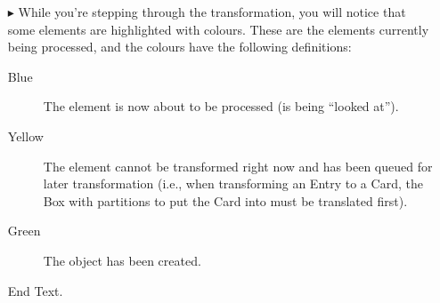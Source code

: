 \begin{itemize}
\newpage

\item[$\blacktriangleright$] While you're stepping through the transformation, you will notice that some elements are highlighted with colours. These are the
elements currently being processed, and the colours have the following definitions:

\begin{description}
  \item[Blue] The element is now about to be processed (is being ``looked at'').
  
  \item[Yellow] The element cannot be transformed right now and has been queued for later transformation (i.e., when transforming an Entry to a Card, the Box
  with partitions to put the Card into must be translated first).
  
  \item[Green] The object has been created.
\end{description}

End Text.

\end{itemize}

